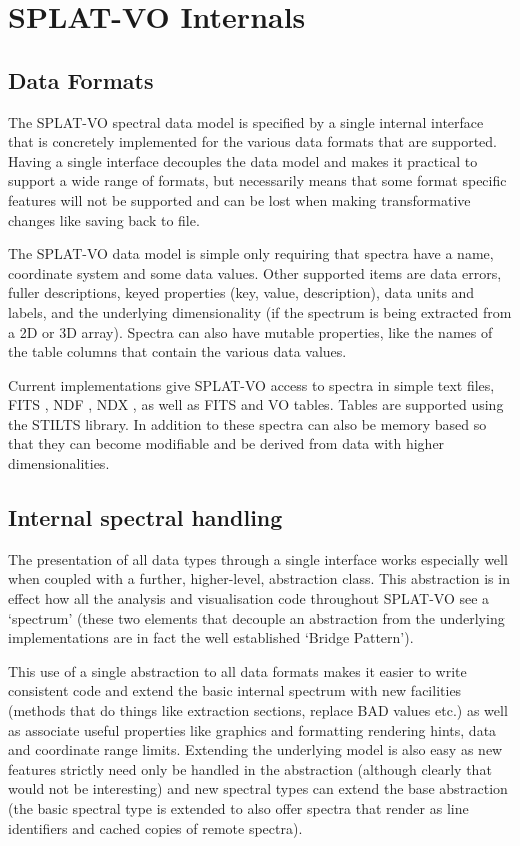 \documentclass[final,authoryear,5p,times,twocolumn]{elsarticle}
\begin{document}
\section{SPLAT-VO Internals}

\subsection{Data Formats}

The SPLAT-VO spectral data model is specified by a single internal interface
that is concretely implemented for the various data formats that are
supported. Having a single interface decouples the data model and makes it
practical to support a wide range of formats, but necessarily means that some
format specific features will not be supported and can be lost when making
transformative changes like saving back to file.

The SPLAT-VO data model is simple only requiring that spectra have a name,
coordinate system and some data values. Other supported items are data errors,
fuller descriptions, keyed properties (key, value, description), data units
and labels, and the underlying dimensionality (if the spectrum is being
extracted from a 2D or 3D array). Spectra can also have mutable properties,
like the names of the table columns that contain the various data values.

Current implementations give SPLAT-VO access to spectra in simple text
files, FITS \citep{2010A&A...524A..42P}, NDF \citep{ndfjenness}, NDX
\citep{2003ASPC..295..221G}, as well as FITS and VO tables. Tables are
supported using the STILTS
\citep[][]{2006ASPC..351..666T} library. In addition to
these spectra can also be memory based so that they can become
modifiable and be derived from data with higher dimensionalities.

\subsection{Internal spectral handling}

The presentation of all data types through a single interface works especially
well when coupled with a further, higher-level, abstraction class. This
abstraction is in effect how all the analysis and visualisation code
throughout SPLAT-VO see a `spectrum' (these two elements that decouple an
abstraction from the underlying implementations are in fact the well
established `Bridge Pattern').

This use of a single abstraction to all data formats makes it easier to write
consistent code and extend the basic internal spectrum with new facilities
(methods that do things like extraction sections, replace BAD values etc.) as
well as associate useful properties like graphics and formatting rendering
hints, data and coordinate range limits. Extending the underlying model is
also easy as new features strictly need only be handled in the abstraction
(although clearly that would not be interesting) and new spectral types can
extend the base abstraction (the basic spectral type is extended to also offer
spectra that render as line identifiers and cached copies of remote spectra).
\end{document}
